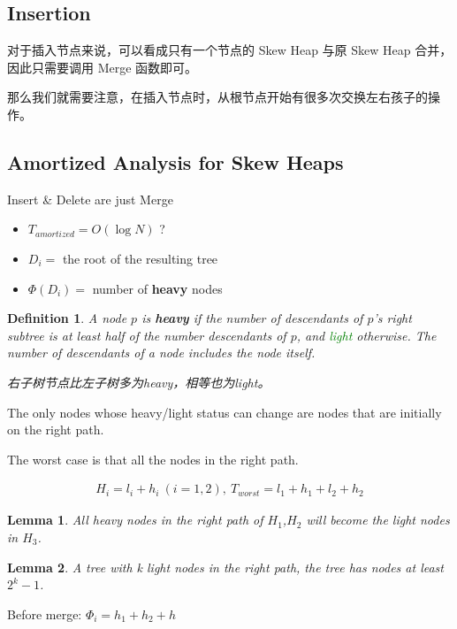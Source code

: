 \documentclass{article}
\newtheorem*{Definition}{Definition}
\newtheorem*{Lemma}{Lemma}
\begin{document}
\subsection{Insertion}

对于插入节点来说，可以看成只有一个节点的 Skew Heap 与原 Skew Heap 合并，因此只需要调用 Merge 函数即可。

那么我们就需要注意，在插入节点时，从根节点开始有很多次交换左右孩子的操作。

\subsection{Amortized Analysis for Skew Heaps}
Insert \& Delete are just Merge
\begin{itemize}
    \item $T_{amortized}=O(\log N)$ ?
    \item $D_i=$ the root of the resulting tree 
    \item $\Phi(D_i)=$ number of \textbf{heavy} nodes
\end{itemize}
\begin{Definition}
    A node $p$ is \textbf{heavy} if the number of descendants of $p$'s right subtree is at least half of the number descendants of $p$, and \textcolor{green}{light} otherwise. The number of descendants of a node includes the node itself. \par
    右子树节点比左子树多为heavy，相等也为light。
\end{Definition}

The only nodes whose heavy/light status can change are nodes that are initially on the right path.\par
The worst case is that all the nodes in the right path.\par
\begin{align*}
    H_i=l_i+h_i\ (i=1,2),\ T_{worst}=l_1+h_1+l_2+h_2
\end{align*}

\begin{Lemma}
    All heavy nodes in the right path of $H_1$,$H_2$ will become the light nodes in $H_3$.\par
\end{Lemma}

\begin{Lemma}
    A tree with k light nodes in the right path, the tree has nodes at least $2^k - 1$.
\end{Lemma}

Before merge: $\Phi_i=h_1+h_2+h$
\end{document}
